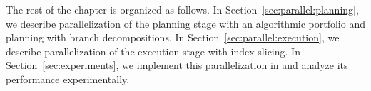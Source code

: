 The rest of the chapter is organized as follows. 
In Section~\ref{sec:parallel:planning}, we describe parallelization of the planning stage with an algorithmic portfolio and planning with branch decompositions.
In Section~\ref{sec:parallel:execution}, we describe parallelization of the execution stage with index slicing. 
In Section~\ref{sec:experiments}, we implement this parallelization in  and analyze its performance experimentally.








